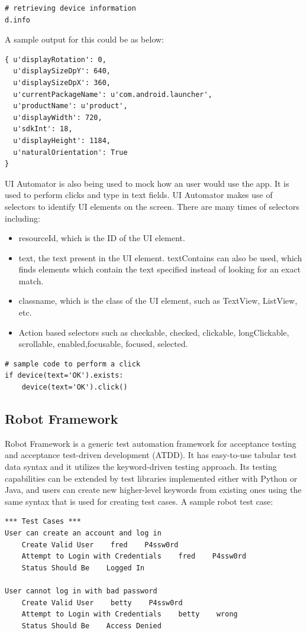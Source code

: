 \begin{lstlisting}[style=PyStyle]
# retrieving device information
d.info 
\end{lstlisting}

A sample output for this could be as below:
\begin{lstlisting}[style=PyStyle]
{ u'displayRotation': 0,
  u'displaySizeDpY': 640,
  u'displaySizeDpX': 360,
  u'currentPackageName': u'com.android.launcher',
  u'productName': u'product',
  u'displayWidth': 720,
  u'sdkInt': 18,
  u'displayHeight': 1184,
  u'naturalOrientation': True
}
\end{lstlisting}

UI Automator is also being used to mock how an user would use the app. It is used to perform clicks and type in text fields. UI Automator makes use of selectors to identify UI elements on the screen. There are many times of selectors including:
\begin{itemize}
	\item resourceId, which is the ID of the UI element.
	\item text, the text present in the UI element. textContains can also be used, which finds elements which contain the text specified instead of looking for an exact match.
	\item classname, which is the class of the UI element, such as TextView, ListView, etc.
	\item Action based selectors such as checkable, checked, clickable, longClickable, scrollable, enabled,focusable, focused, selected.
\end{itemize}
\begin{lstlisting}[style=PyStyle]
# sample code to perform a click
if device(text='OK').exists:
    device(text='OK').click()
\end{lstlisting}

\subsection{Robot Framework}Robot Framework is a generic test automation framework for acceptance testing and acceptance test-driven development (ATDD). It has easy-to-use tabular test data syntax and it utilizes the keyword-driven testing approach. Its testing capabilities can be extended by test libraries implemented either with Python or Java, and users can create new higher-level keywords from existing ones using the same syntax that is used for creating test cases.\cite{robot}
A sample robot test case:
\begin{lstlisting}[style=PyStyle]
*** Test Cases ***
User can create an account and log in
    Create Valid User    fred    P4ssw0rd
    Attempt to Login with Credentials    fred    P4ssw0rd
    Status Should Be    Logged In

User cannot log in with bad password
    Create Valid User    betty    P4ssw0rd
    Attempt to Login with Credentials    betty    wrong
    Status Should Be    Access Denied
\end{lstlisting}

